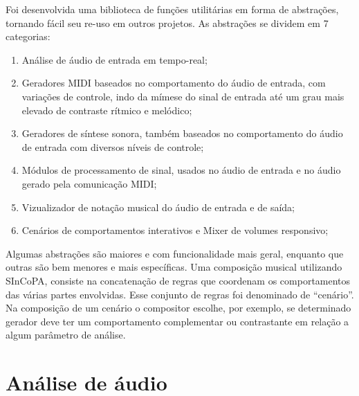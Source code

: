 \documentclass{ppgmus}
\begin{document}
  Foi desenvolvida uma biblioteca de funções utilitárias em forma de abstrações, 
tornando fácil seu re-uso em outros projetos. As abstrações se dividem em 7 categorias:

\begin{enumerate}
 \item Análise de áudio de entrada em tempo-real;
 \item Geradores MIDI baseados no comportamento do áudio de 
entrada, com variações de controle, indo da mímese do sinal de entrada
até um grau mais elevado de contraste rítmico e melódico;
 \item Geradores de síntese sonora, também baseados no comportamento
do áudio de entrada com diversos níveis de controle;
 \item Módulos de processamento de sinal, usados no áudio de entrada e no
áudio gerado pela comunicação MIDI;
 \item Vizualizador de notação musical do áudio de entrada e de saída;
 \item Cenários de comportamentos interativos e Mixer de volumes responsivo;
 
\end{enumerate}

Algumas abstrações são maiores e com funcionalidade mais geral, enquanto
que outras são bem menores e mais específicas.
Uma composição musical utilizando SInCoPA, consiste na concatenação de
regras que coordenam os comportamentos das várias partes envolvidas.
Esse conjunto de regras foi denominado de ``cenário''. Na composição
de um cenário o compositor escolhe, por exemplo,  se determinado gerador 
deve ter um comportamento complementar ou contrastante  em relação a algum
parâmetro de análise.









\section{Análise de áudio}
\end{document}
